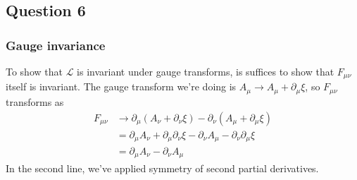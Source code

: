 \subsection{Question 6}
\subsubsection{Gauge invariance}  
To show that $\mathcal{L}$ is invariant under gauge transforms, is suffices to show that $F_{\mu \nu}$ itself is invariant. The gauge transform we're doing is $A_\mu \rightarrow A_\mu + \partial_\mu \xi $, so $F_{ \mu\nu}$  transforms as 
\begin{align*}  
F_{ \mu \nu} & \rightarrow \partial_\mu ( A_\nu + \partial_\nu \xi)  - \partial_\nu ( A_\mu + \partial_\mu \xi ) \\
& = \partial_\mu A_\nu + \partial_\mu \partial_\nu \xi  - \partial_\nu A_\mu  - \partial_\nu \partial_\mu \xi \\ 
&= \partial_\mu A_\nu - \partial_\nu A_\mu 
\end{align*} 
In the second line, we've applied symmetry of second partial derivatives. 


